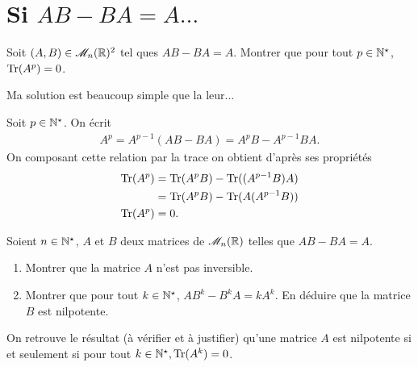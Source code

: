\section{Si \texorpdfstring{$AB - BA = A \dots$}{AB-BA=A...}}
\begin{exercice}
    Soit $(A, B) \in \mathscr{M}_n(\mathbb{R})^2$ tel ques $AB-BA=A$. Montrer que pour tout $p \in \mathbb{N}^\star$, $\mathrm{Tr}(A^p) = 0$.
\end{exercice}


Ma solution est beaucoup simple que la leur...
\begin{solution}
    Soit $p \in \mathbb{N}^\star$. On écrit
    \begin{align*}
        A^p = A^{p-1}(AB-BA) = A^pB - A^{p-1}BA.
    \end{align*}
    On composant cette relation par la trace on obtient d'après ses propriétés
    \begin{align*}
        \mathrm{Tr}(A^p) &= \mathrm{Tr}(A^pB) - \mathrm{Tr}((A^{p-1}B)A) \\
        &= \mathrm{Tr}(A^pB) - \mathrm{Tr}(A(A^{p-1}B)) \\
        \mathrm{Tr}(A^p) &= 0.
    \end{align*}
\end{solution}

\begin{exercice} 
    Soient $n \in \mathbb{N}^\star$, $A$ et $B$ deux matrices de $\mathscr{M}_n(\mathbb{R})$ telles que $AB - BA = A.$
    \begin{enumerate}
        \item Montrer que la matrice $A$ n'est pas inversible.
        \item Montrer que pour tout $k \in \mathbb{N}^\star$, $AB^k - B^k A = k A^k$. En déduire que la matrice $B$ est nilpotente. 
    \end{enumerate}
\end{exercice}

\begin{remarque}
    On retrouve le résultat (à vérifier et à justifier) qu'une matrice $A$ est nilpotente si et seulement si pour tout $k \in \mathbb{N}^\star, \mathrm{Tr}(A^k) = 0$.
\end{remarque}


